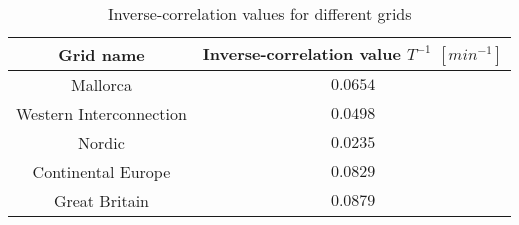 \documentclass[varwidth=\maxdimen]{standalone}
\begin{document}
	\begin{table}[h]
		\caption{Inverse-correlation values for different grids}
		\centering
		\label{tab:invCorr}
		\begin{tabular}{ c  c}
			\toprule
			Grid name & Inverse-correlation value $T^{-1}$ $[min^{-1}]$\\[0pt]
			\midrule
			Mallorca & $0.0654$\\[0pt]
	
			Western Interconnection & $0.0498$\\[0pt]

			Nordic & $0.0235$\\[0pt]
	
			Continental Europe & $0.0829$\\[0pt]

			Great Britain & $0.0879$\\[0pt]
			\bottomrule			
		\end{tabular}
	\end{table}
\end{document}
